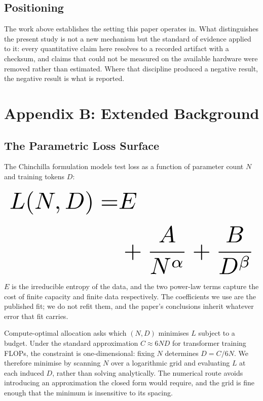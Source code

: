 \documentclass[10pt,twocolumn,letterpaper]{article}
\begin{document}
\subsection{Positioning}


The work above establishes the setting this paper operates in. What distinguishes the present study is not a new mechanism but the standard of evidence applied to it: every quantitative claim here resolves to a recorded artifact with a checksum, and claims that could not be measured on the available hardware were removed rather than estimated. Where that discipline produced a negative result, the negative result is what is reported.




\section{Appendix B: Extended Background}



\subsection{The Parametric Loss Surface}


The Chinchilla formulation models test loss as a function of parameter count $N$ and training tokens $D$:






\begin{equation}
\resizebox{\columnwidth}{!}{$\displaystyle
\begin{aligned}
L(N, D) = & E \\
& + \frac{A}{N^{\alpha}} + \frac{B}{D^{\beta}}
\end{aligned}
$}
\end{equation}






$E$ is the irreducible entropy of the data, and the two power-law terms capture the cost of finite capacity and finite data respectively. The coefficients we use are the published fit; we do not refit them, and the paper's conclusions inherit whatever error that fit carries.

Compute-optimal allocation asks which $(N, D)$ minimises $L$ subject to a budget. Under the standard approximation $C \approx 6ND$ for transformer training FLOPs, the constraint is one-dimensional: fixing $N$ determines $D = C / 6N$. We therefore minimise by scanning $N$ over a logarithmic grid and evaluating $L$ at each induced $D$, rather than solving analytically. The numerical route avoids introducing an approximation the closed form would require, and the grid is fine enough that the minimum is insensitive to its spacing.
\end{document}
